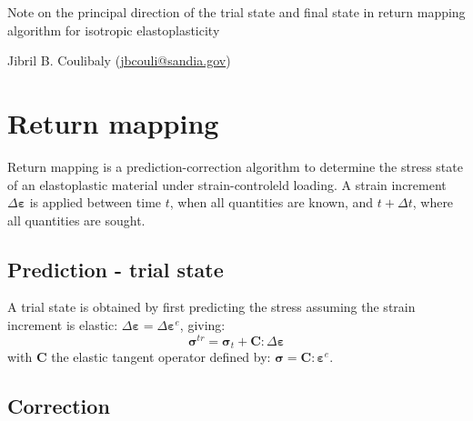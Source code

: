 \documentclass[letterpaper,12pt]{article}
\begin{document}

\renewcommand\bibname{References}

\begin{center}
{\large
Note on the principal direction of the trial state and final state in return mapping algorithm for isotropic elastoplasticity}

Jibril B. Coulibaly (\href{mailto:jbcouli@sandia.gov}{jbcouli@sandia.gov})
\end{center}


\section{Return mapping}

Return mapping is a prediction-correction algorithm to determine the stress state of an elastoplastic material under strain-controleld loading. A strain increment $\Delta \boldsymbol{\varepsilon}$ is applied between time $t$, when all quantities are known, and $t+\Delta t$, where all quantities are sought.

\subsection{Prediction - trial state}

A trial state is obtained by first predicting the stress assuming the strain increment is elastic: $\Delta\boldsymbol{\varepsilon}=\Delta\boldsymbol{\varepsilon}^e$, giving:
\begin{equation}
\boldsymbol{\sigma}^{tr} = \boldsymbol{\sigma}_t + \boldsymbol{C}:\Delta \boldsymbol{\varepsilon}
\end{equation}
with $\boldsymbol{C}$ the elastic tangent operator defined by: $\boldsymbol{\sigma} = \mathbf{C} : \boldsymbol{\varepsilon}^e$.



\subsection{Correction}
\end{document}
